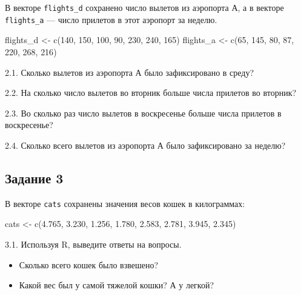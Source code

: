 \documentclass[
]{article}
\newenvironment{Shaded}{\begin{snugshade}}{\end{snugshade}}
\newcommand{\DecValTok}[1]{\textcolor[rgb]{0.00,0.00,0.81}{#1}}
\newcommand{\FloatTok}[1]{\textcolor[rgb]{0.00,0.00,0.81}{#1}}
\newcommand{\FunctionTok}[1]{\textcolor[rgb]{0.00,0.00,0.00}{#1}}
\newcommand{\NormalTok}[1]{#1}
\newcommand{\OtherTok}[1]{\textcolor[rgb]{0.56,0.35,0.01}{#1}}
\providecommand{\tightlist}{%
  \setlength{\itemsep}{0pt}\setlength{\parskip}{0pt}}
\begin{document}
В векторе \texttt{flights\_d} сохранено число вылетов из аэропорта А, а
в векторе \texttt{flights\_a} --- число прилетов в этот аэропорт за
неделю.

\begin{Shaded}
\begin{Highlighting}[]
\NormalTok{flights\_d }\OtherTok{\textless{}{-}} \FunctionTok{c}\NormalTok{(}\DecValTok{140}\NormalTok{, }\DecValTok{150}\NormalTok{, }\DecValTok{100}\NormalTok{, }\DecValTok{90}\NormalTok{, }\DecValTok{230}\NormalTok{, }\DecValTok{240}\NormalTok{, }\DecValTok{165}\NormalTok{)}
\NormalTok{flights\_a }\OtherTok{\textless{}{-}} \FunctionTok{c}\NormalTok{(}\DecValTok{65}\NormalTok{, }\DecValTok{145}\NormalTok{, }\DecValTok{80}\NormalTok{, }\DecValTok{87}\NormalTok{, }\DecValTok{220}\NormalTok{, }\DecValTok{268}\NormalTok{, }\DecValTok{216}\NormalTok{)}
\end{Highlighting}
\end{Shaded}

2.1. Сколько вылетов из аэропорта А было зафиксировано в среду?

2.2. На сколько число вылетов во вторник больше числа прилетов во
вторник?

2.3. Во сколько раз число вылетов в воскресенье больше числа прилетов в
воскресенье?

2.4. Сколько всего вылетов из аэропорта А было зафиксировано за неделю?

\hypertarget{ux437ux430ux434ux430ux43dux438ux435-3}{%
\subsection{Задание 3}\label{ux437ux430ux434ux430ux43dux438ux435-3}}

В векторе \texttt{cats} сохранены значения весов кошек в килограммах:

\begin{Shaded}
\begin{Highlighting}[]
\NormalTok{cats }\OtherTok{\textless{}{-}} \FunctionTok{c}\NormalTok{(}\FloatTok{4.765}\NormalTok{, }\FloatTok{3.230}\NormalTok{, }\FloatTok{1.256}\NormalTok{, }\FloatTok{1.780}\NormalTok{, }\FloatTok{2.583}\NormalTok{, }\FloatTok{2.781}\NormalTok{, }\FloatTok{3.945}\NormalTok{, }\FloatTok{2.345}\NormalTok{)}
\end{Highlighting}
\end{Shaded}

3.1. Используя R, выведите ответы на вопросы.

\begin{itemize}
\tightlist
\item
  Сколько всего кошек было взвешено?
\item
  Какой вес был у самой тяжелой кошки? А у легкой?
\end{itemize}
\end{document}

